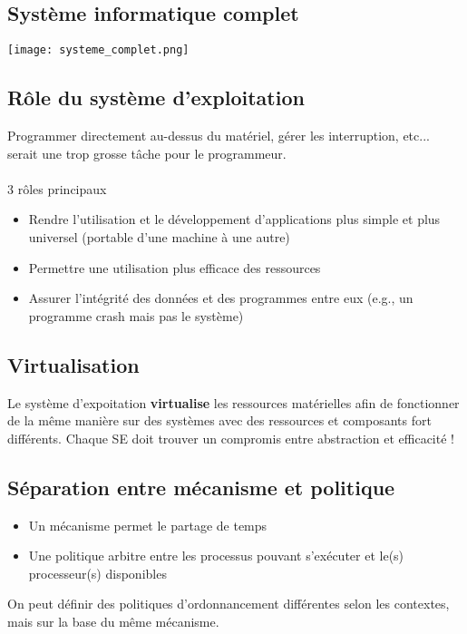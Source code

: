 \documentclass{article}
\begin{document}
    \subsection{Système informatique complet}
        \texttt{[image: systeme\_complet.png]}
    
    \subsection{Rôle du système d'exploitation}
        Programmer directement au-dessus du matériel, gérer les interruption, etc... serait une trop grosse tâche pour le programmeur.\\\\
        3 rôles principaux
        \begin{itemize}
            \item Rendre l’utilisation et le développement d’applications
            plus simple et plus universel (portable d’une machine à
            une autre)
            \item Permettre une utilisation plus efficace des ressources
            \item Assurer l’intégrité des données et des programmes
            entre eux (e.g., un programme crash mais pas le système)
        \end{itemize}
    
    \subsection{Virtualisation}
        Le système d'expoitation \textbf{virtualise} les ressources matérielles afin de fonctionner de la même manière sur des systèmes avec des ressources et composants fort différents.
        Chaque SE doit trouver un compromis entre abstraction et efficacité !

    \subsection{Séparation entre mécanisme et politique}
        \begin{itemize}
            \item Un mécanisme permet le partage de temps
            \item Une politique arbitre entre les processus pouvant s’exécuter
            et le(s) processeur(s) disponibles
        \end{itemize}
        On peut définir des politiques d’ordonnancement différentes selon les contextes, mais sur la base du même mécanisme.
    
\end{document}
